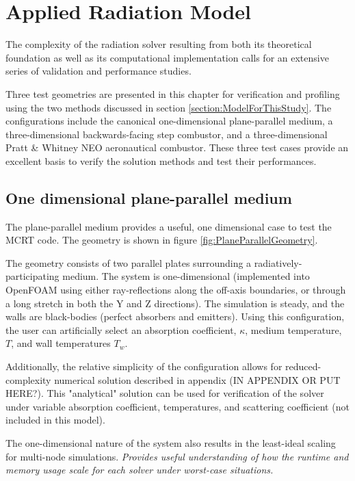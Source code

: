 \addchapheadtotoc
\chapter{Applied Radiation Model}\label{chapter:Example}
The complexity of the radiation solver resulting from both its theoretical foundation as well as its computational implementation calls for an extensive series of validation and performance studies.

Three test geometries are presented in this chapter for verification and profiling using the two methods discussed in section \ref{section:ModelForThisStudy}. The configurations include the canonical one-dimensional plane-parallel medium, a three-dimensional backwards-facing step combustor, and a three-dimensional Pratt \& Whitney NEO aeronautical combustor. 
These three test cases provide an excellent basis to verify the solution methods and test their performances. 



\section{One dimensional plane-parallel medium}
The plane-parallel medium provides a useful, one dimensional case to test the MCRT code. The geometry is shown in figure \ref{fig:PlaneParallelGeometry}.

The geometry consists of two parallel plates surrounding a radiatively-participating medium. The system is one-dimensional (implemented into OpenFOAM using either ray-reflections along the off-axis boundaries, or through a long stretch in both the Y and Z directions). The simulation is steady, and the walls are black-bodies (perfect absorbers and emitters).
Using this configuration, the user can artificially select an absorption coefficient, $\kappa{}$, medium temperature, $T$, and wall temperatures $T_w$.

Additionally, the relative simplicity of the configuration allows for reduced-complexity numerical solution described in appendix (IN APPENDIX OR PUT HERE?). 
This "analytical" solution can be used for verification of the solver under variable absorption coefficient, temperatures, and scattering coefficient (not included in this model).

The one-dimensional nature of the system also results in the least-ideal scaling for multi-node simulations. \textit{Provides useful understanding of how the runtime and memory usage scale for each solver under worst-case situations.}

